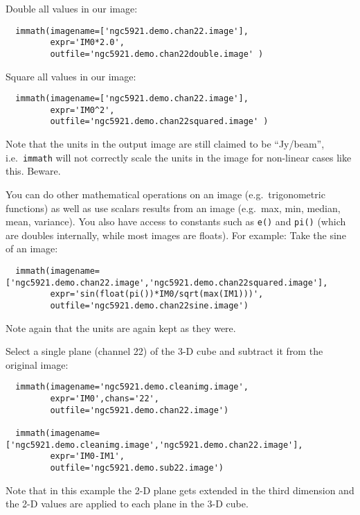 Double all values in our image:
\small
\begin{verbatim}
  immath(imagename=['ngc5921.demo.chan22.image'],
         expr='IM0*2.0',
         outfile='ngc5921.demo.chan22double.image' )
\end{verbatim}
\normalsize
    
Square all values in our image:
\small
\begin{verbatim}
  immath(imagename=['ngc5921.demo.chan22.image'],
         expr='IM0^2',
         outfile='ngc5921.demo.chan22squared.image' )
\end{verbatim}
\normalsize
Note that the units in the output image are still claimed to be
``Jy/beam'', i.e.\ {\tt immath} will not correctly scale the units
in the image for non-linear cases like this.  Beware.

You can do other mathematical operations on an image (e.g.\
trigonometric functions) as well as use scalars results from an image
(e.g.\ max, min, median, mean, variance).  You also have access to
constants such as {\tt e()} and {\tt pi()} (which are doubles
internally, while most images are floats). For example:
Take the sine of an image:
\small
\begin{verbatim}
  immath(imagename=['ngc5921.demo.chan22.image','ngc5921.demo.chan22squared.image'],
         expr='sin(float(pi())*IM0/sqrt(max(IM1)))',
         outfile='ngc5921.demo.chan22sine.image')
\end{verbatim}
\normalsize
Note again that the units are again kept as they were.
    
Select a single plane (channel 22) of the 3-D cube and  
subtract it from the original image: 
\small
\begin{verbatim}
  immath(imagename='ngc5921.demo.cleanimg.image',
         expr='IM0',chans='22',
         outfile='ngc5921.demo.chan22.image')

  immath(imagename=['ngc5921.demo.cleanimg.image','ngc5921.demo.chan22.image'],
         expr='IM0-IM1',
         outfile='ngc5921.demo.sub22.image')
\end{verbatim}
\normalsize
Note that in this example the 2-D plane gets extended in the third
dimension and the 2-D values are applied to each plane in the 3-D cube. 

    

